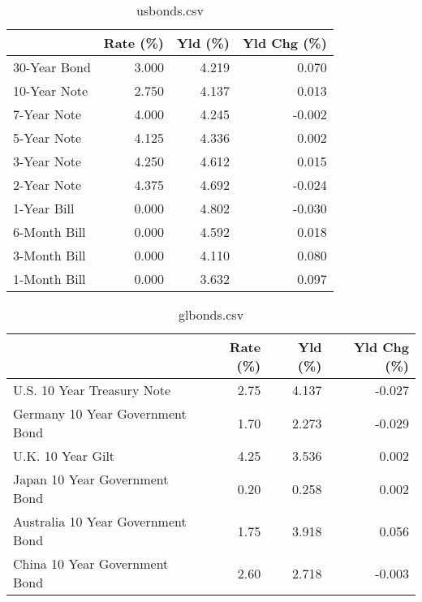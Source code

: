 \documentclass{article}%
\begin{document}
%


\begin{table}[htbp]%
\caption{usbonds.csv}%
\centering%
\begin{adjustbox}{width=1\textwidth}%
\begin{tabular}{lrrr}
\toprule
             &  Rate (\%) &  Yld (\%) &  Yld Chg (\%) \\
\midrule
30-Year Bond &     3.000 &    4.219 &        0.070 \\
10-Year Note &     2.750 &    4.137 &        0.013 \\
 7-Year Note &     4.000 &    4.245 &       -0.002 \\
 5-Year Note &     4.125 &    4.336 &        0.002 \\
 3-Year Note &     4.250 &    4.612 &        0.015 \\
 2-Year Note &     4.375 &    4.692 &       -0.024 \\
 1-Year Bill &     0.000 &    4.802 &       -0.030 \\
6-Month Bill &     0.000 &    4.592 &        0.018 \\
3-Month Bill &     0.000 &    4.110 &        0.080 \\
1-Month Bill &     0.000 &    3.632 &        0.097 \\
\bottomrule
\end{tabular}
%
\end{adjustbox}%
\end{table}

%


\begin{table}[htbp]%
\caption{glbonds.csv}%
\centering%
\begin{adjustbox}{width=1\textwidth}%
\begin{tabular}{lrrr}
\toprule
                                  &  Rate (\%) &  Yld (\%) &  Yld Chg (\%) \\
\midrule
       U.S. 10 Year Treasury Note &      2.75 &    4.137 &       -0.027 \\
  Germany 10 Year Government Bond &      1.70 &    2.273 &       -0.029 \\
                U.K. 10 Year Gilt &      4.25 &    3.536 &        0.002 \\
    Japan 10 Year Government Bond &      0.20 &    0.258 &        0.002 \\
Australia 10 Year Government Bond &      1.75 &    3.918 &        0.056 \\
    China 10 Year Government Bond &      2.60 &    2.718 &       -0.003 \\
\bottomrule
\end{tabular}
%
\end{adjustbox}%
\end{table}
\end{document}
